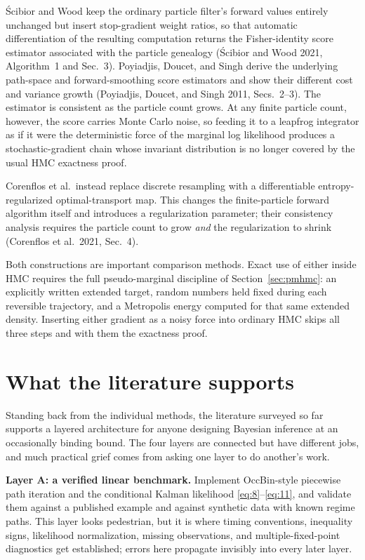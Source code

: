 \documentclass[11pt]{article}
\begin{document}
\'Scibior and Wood keep the ordinary particle filter's forward values entirely
unchanged but insert stop-gradient weight ratios, so that automatic
differentiation of the resulting computation returns the Fisher-identity score
estimator associated with the particle genealogy (\'Scibior and Wood 2021,
Algorithm~1 and Sec.~3). Poyiadjis, Doucet, and Singh derive the underlying
path-space and forward-smoothing score estimators and show their different cost
and variance growth (Poyiadjis, Doucet, and Singh 2011, Secs.~2--3). The
estimator is consistent as the particle count grows. At any finite particle
count, however, the score carries Monte Carlo noise, so feeding it to a
leapfrog integrator as if it were the deterministic force of the marginal
log likelihood produces a stochastic-gradient chain whose invariant
distribution is no longer covered by the usual HMC exactness proof.

Corenflos et al.\ instead replace discrete resampling with a differentiable
entropy-regularized optimal-transport map. This changes the finite-particle
forward algorithm itself and introduces a regularization parameter; their
consistency analysis requires the particle count to grow \emph{and} the
regularization to shrink (Corenflos et al.\ 2021, Sec.~4).

Both constructions are important comparison methods. Exact use of either
inside HMC requires the full pseudo-marginal discipline of
Section~\ref{sec:pmhmc}: an explicitly written extended target, random numbers held
fixed during each reversible trajectory, and a Metropolis energy computed for
that same extended density. Inserting either gradient as a noisy force into
ordinary HMC skips all three steps and with them the exactness proof.

\section{What the literature supports}\label{sec:synthesis}

Standing back from the individual methods, the literature surveyed so far
supports a layered architecture for anyone designing Bayesian inference at an
occasionally binding bound. The four layers are connected but have different
jobs, and much practical grief comes from asking one layer to do another's
work.

\textbf{Layer A: a verified linear benchmark.} Implement OccBin-style piecewise
path iteration and the conditional Kalman likelihood \eqref{eq:8}--\eqref{eq:11},
and validate them against a published example and against synthetic data with
known regime paths. This layer looks pedestrian, but it is where timing
conventions, inequality signs, likelihood normalization, missing observations,
and multiple-fixed-point diagnostics get established; errors here propagate
invisibly into every later layer.
\end{document}
